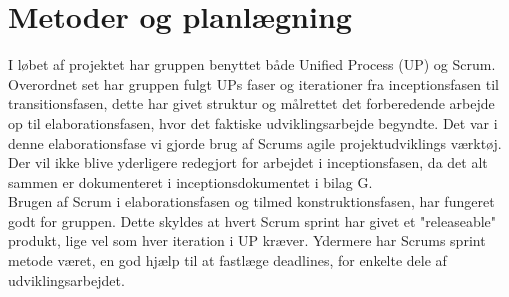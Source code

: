 \section{Metoder og planlægning}
I løbet af projektet har gruppen benyttet både Unified Process (UP) og Scrum. Overordnet set har gruppen fulgt UPs faser og iterationer fra inceptionsfasen til transitionsfasen, dette har givet struktur og målrettet det forberedende arbejde op til elaborationsfasen, hvor det faktiske udviklingsarbejde begyndte. Det var i denne elaborationsfase vi gjorde brug af Scrums agile projektudviklings værktøj. 
Der vil ikke blive yderligere redegjort for arbejdet i inceptionsfasen, da det alt sammen er dokumenteret i inceptionsdokumentet i bilag G.  \\
Brugen af Scrum i elaborationsfasen og tilmed konstruktionsfasen, har fungeret godt for gruppen. Dette skyldes at hvert Scrum sprint har givet et "releaseable" produkt, lige vel som hver iteration i UP kræver. Ydermere har Scrums sprint metode været, en god hjælp til at fastlæge deadlines, for enkelte dele af udviklingsarbejdet.


